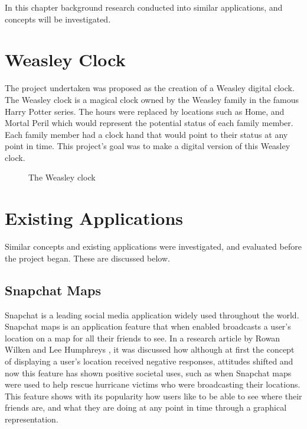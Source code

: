 In this chapter background research conducted into similar applications, and concepts will be investigated. 
\section{Weasley Clock}

The project undertaken was proposed as the creation of a Weasley digital clock. The Weasley clock is a magical clock owned by the Weasley family in the famous Harry Potter series. The hours were replaced by locations such as Home, and Mortal Peril which would represent the potential status of each family member. Each family member had a clock hand that would point to their status at any point in time. This project's goal was to make a digital version of this Weasley clock. 
\begin{figure}[!htbp]
    \centering
    \begin{subfigure}[b]{0.25\textwidth}
    \end{subfigure}
    \caption[The Weasley clock]{The Weasley clock \cite{weasClockWiki}}
    \label{fig:weasClock}
\end{figure}
\FloatBarrier

\section{Existing Applications}
Similar concepts and existing applications were investigated, and evaluated before the project began. These are discussed below. 


\subsection{Snapchat Maps}
Snapchat is a leading social media application widely used throughout the world. Snapchat maps is an application feature that when enabled broadcasts a user's location on a map for all their friends to see. In a research article by Rowan Wilken and Lee Humphreys \cite{snapMaps}, it was discussed how although at first the concept of displaying a user's location received negative responses, attitudes shifted and now this feature has shown positive societal uses, such as when Snapchat maps were used to help rescue hurricane victims who were broadcasting their locations. This feature shows with its popularity how users like to be able to see where their friends are, and what they are doing at any point in time through a graphical representation. 

